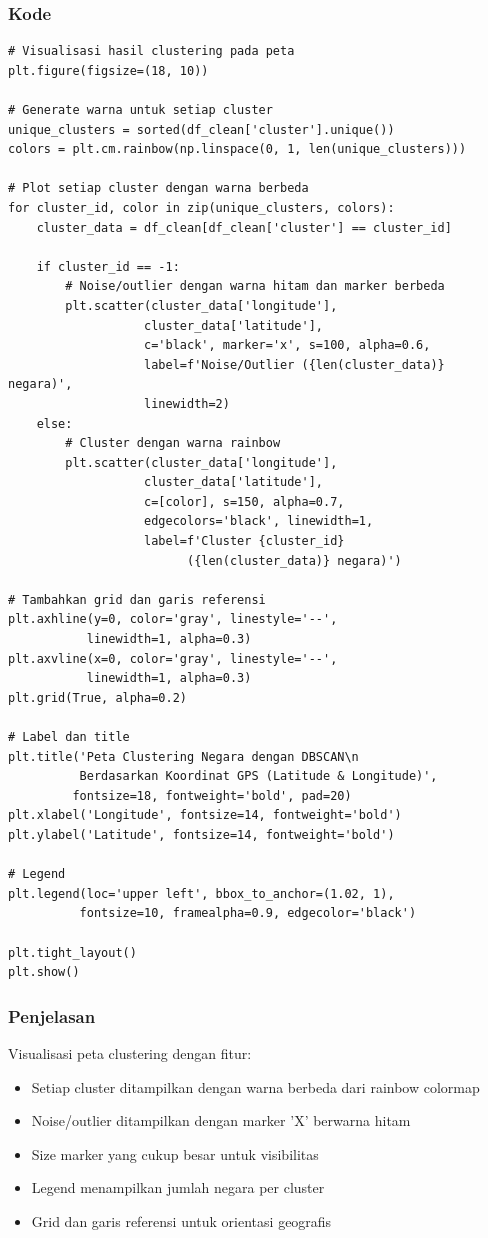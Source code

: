 \documentclass[12pt,a4paper]{article}
\begin{document}
\subsubsection{Kode}
\begin{lstlisting}[style=pythonstyle]
# Visualisasi hasil clustering pada peta
plt.figure(figsize=(18, 10))

# Generate warna untuk setiap cluster
unique_clusters = sorted(df_clean['cluster'].unique())
colors = plt.cm.rainbow(np.linspace(0, 1, len(unique_clusters)))

# Plot setiap cluster dengan warna berbeda
for cluster_id, color in zip(unique_clusters, colors):
    cluster_data = df_clean[df_clean['cluster'] == cluster_id]
    
    if cluster_id == -1:
        # Noise/outlier dengan warna hitam dan marker berbeda
        plt.scatter(cluster_data['longitude'], 
                   cluster_data['latitude'],
                   c='black', marker='x', s=100, alpha=0.6,
                   label=f'Noise/Outlier ({len(cluster_data)} negara)', 
                   linewidth=2)
    else:
        # Cluster dengan warna rainbow
        plt.scatter(cluster_data['longitude'], 
                   cluster_data['latitude'],
                   c=[color], s=150, alpha=0.7, 
                   edgecolors='black', linewidth=1,
                   label=f'Cluster {cluster_id} 
                         ({len(cluster_data)} negara)')

# Tambahkan grid dan garis referensi
plt.axhline(y=0, color='gray', linestyle='--', 
           linewidth=1, alpha=0.3)
plt.axvline(x=0, color='gray', linestyle='--', 
           linewidth=1, alpha=0.3)
plt.grid(True, alpha=0.2)

# Label dan title
plt.title('Peta Clustering Negara dengan DBSCAN\n
          Berdasarkan Koordinat GPS (Latitude & Longitude)', 
         fontsize=18, fontweight='bold', pad=20)
plt.xlabel('Longitude', fontsize=14, fontweight='bold')
plt.ylabel('Latitude', fontsize=14, fontweight='bold')

# Legend
plt.legend(loc='upper left', bbox_to_anchor=(1.02, 1), 
          fontsize=10, framealpha=0.9, edgecolor='black')

plt.tight_layout()
plt.show()
\end{lstlisting}

\subsubsection{Penjelasan}
Visualisasi peta clustering dengan fitur:
\begin{itemize}
    \item Setiap cluster ditampilkan dengan warna berbeda dari rainbow colormap
    \item Noise/outlier ditampilkan dengan marker 'X' berwarna hitam
    \item Size marker yang cukup besar untuk visibilitas
    \item Legend menampilkan jumlah negara per cluster
    \item Grid dan garis referensi untuk orientasi geografis
\end{itemize}
\end{document}
